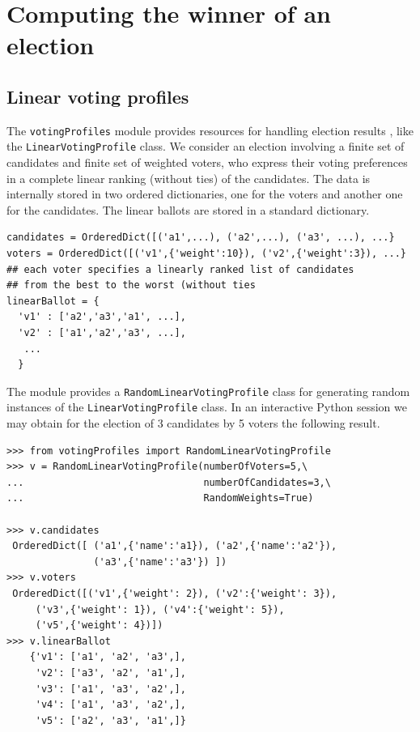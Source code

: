 \chapter{Computing the winner of an election}
\label{sec:7}



\section{Linear voting profiles}
\label{sec:7.1}

The {\tt votingProfiles} module provides resources for handling election results \citep{ADT-L2}, like the \texttt{LinearVotingProfile} class. We consider an election involving a finite set of candidates and finite set of weighted voters, who express their voting preferences in a complete linear ranking (without ties) of the candidates. The data is internally stored in two ordered dictionaries, one for the voters and another one for the candidates. The linear ballots are stored in a standard dictionary.

\begin{lstlisting}[basicstyle=\footnotesize]
candidates = OrderedDict([('a1',...), ('a2',...), ('a3', ...), ...}
voters = OrderedDict([('v1',{'weight':10}), ('v2',{'weight':3}), ...}
## each voter specifies a linearly ranked list of candidates
## from the best to the worst (without ties
linearBallot = {
  'v1' : ['a2','a3','a1', ...],
  'v2' : ['a1','a2','a3', ...],
   ...
  }
\end{lstlisting}

The module provides a \texttt{RandomLinearVotingProfile} class for generating random instances of the \texttt{LinearVotingProfile} class. In an interactive Python session we may obtain for the election of 3 candidates by 5 voters the following result.

\begin{lstlisting}[caption={Example of random linear voting profile},label=list:7.1,basicstyle=\footnotesize]
>>> from votingProfiles import RandomLinearVotingProfile
>>> v = RandomLinearVotingProfile(numberOfVoters=5,\
...                               numberOfCandidates=3,\
...                               RandomWeights=True)
   
>>> v.candidates
 OrderedDict([ ('a1',{'name':'a1}), ('a2',{'name':'a2'}),
               ('a3',{'name':'a3'}) ])
>>> v.voters
 OrderedDict([('v1',{'weight': 2}), ('v2':{'weight': 3}), 
     ('v3',{'weight': 1}), ('v4':{'weight': 5}), 
     ('v5',{'weight': 4})])
>>> v.linearBallot
    {'v1': ['a1', 'a2', 'a3',],
     'v2': ['a3', 'a2', 'a1',],
     'v3': ['a1', 'a3', 'a2',],
     'v4': ['a1', 'a3', 'a2',],
     'v5': ['a2', 'a3', 'a1',]} 
 \end{lstlisting}

